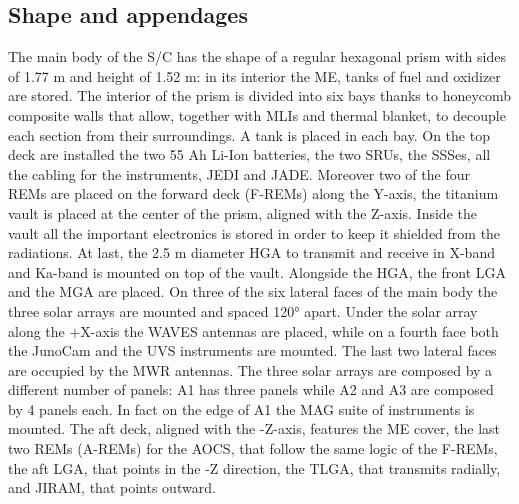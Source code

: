 \subsection{Shape and appendages}
\label{subsec:shape_appendages}


The main body of the S/C has the shape of a regular hexagonal prism with sides of 1.77 m and height of 1.52 m: in its interior the ME, tanks of fuel and oxidizer are stored.
The interior of the prism is divided into six bays thanks to honeycomb composite walls that allow, together with MLIs and thermal blanket, to decouple each section from their surroundings.
A tank is placed in each bay. On the top deck are installed the two 55 Ah Li-Ion batteries, the two SRUs, the SSSes, all the cabling for the instruments, JEDI and JADE.
Moreover two of the four REMs are placed on the forward deck (F-REMs) along the Y-axis, the titanium vault is placed at the center of the prism, aligned with the Z-axis.
Inside the vault all the important electronics is stored in order to keep it shielded from the radiations. At last, the 2.5 m diameter HGA to transmit and receive in X-band and Ka-band is mounted on top of the vault.
Alongside the HGA, the front LGA and the MGA are placed. On three of the six lateral faces of the main body the three solar arrays are mounted and spaced 120° apart.
Under the solar array along the +X-axis the WAVES antennas are placed, while on a fourth face both the JunoCam and the UVS instruments are mounted. The last two lateral faces are occupied by the MWR antennas.
The three solar arrays are composed by a different number of panels: A1 has three panels while A2 and A3 are composed by 4 panels each.
In fact on the edge of A1 the MAG suite of instruments is mounted. The aft deck, aligned with the -Z-axis, features the ME cover, the last two REMs (A-REMs) for the AOCS, that follow the same logic of the F-REMs, the aft LGA, that points in the -Z direction, the TLGA, that transmits radially, and JIRAM, that points outward.